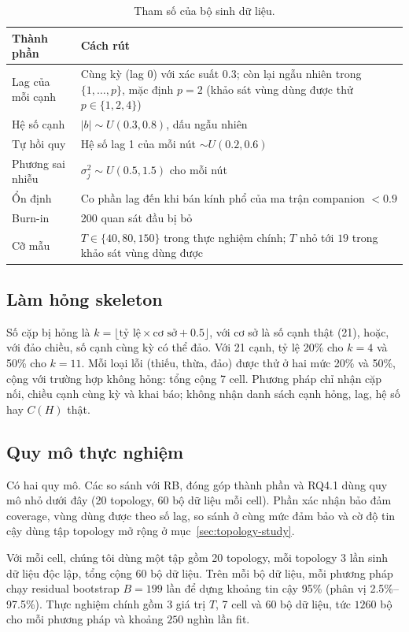 \begin{table}[H]
\centering\small
\begin{tabularx}{\textwidth}{>{\raggedright\arraybackslash}p{4.3cm}Y}
\toprule
Thành phần & Cách rút\\
\midrule
Lag của mỗi cạnh & Cùng kỳ (lag 0) với xác suất $0.3$; còn lại ngẫu nhiên trong $\{1,\dots,p\}$, mặc định $p=2$ (khảo sát vùng dùng được thử $p\in\{1,2,4\}$)\\
Hệ số cạnh & $|b|\sim U(0.3,0.8)$, dấu ngẫu nhiên\\
Tự hồi quy & Hệ số lag 1 của mỗi nút $\sim U(0.2,0.6)$\\
Phương sai nhiễu & $\sigma_j^2\sim U(0.5,1.5)$ cho mỗi nút\\
Ổn định & Co phần lag đến khi bán kính phổ của ma trận companion $<0.9$\\
Burn-in & 200 quan sát đầu bị bỏ\\
Cỡ mẫu & $T\in\{40,80,150\}$ trong thực nghiệm chính; $T$ nhỏ tới $19$ trong khảo sát vùng dùng được\\
\bottomrule
\end{tabularx}
\caption{Tham số của bộ sinh dữ liệu.}
\end{table}

\subsection{Làm hỏng skeleton}\label{sec:damage}
Số cặp bị hỏng là $k=\lfloor \text{tỷ lệ}\times\text{cơ sở}+0.5\rfloor$, với cơ sở là số cạnh thật (21), hoặc, với đảo chiều, số cạnh cùng kỳ có thể đảo. Với 21 cạnh, tỷ lệ 20\% cho $k=4$ và 50\% cho $k=11$. Mỗi loại lỗi (thiếu, thừa, đảo) được thử ở hai mức 20\% và 50\%, cộng với trường hợp không hỏng: tổng cộng 7 cell. Phương pháp chỉ nhận cặp nối, chiều cạnh cùng kỳ và khai báo; không nhận danh sách cạnh hỏng, lag, hệ số hay $C(H)$ thật.

\subsection{Quy mô thực nghiệm}\label{sec:quymo}
Có hai quy mô. Các so sánh với RB, đóng góp thành phần và RQ4.1 dùng quy mô nhỏ dưới đây (20 topology, 60 bộ dữ liệu mỗi cell). Phần xác nhận bảo đảm coverage, vùng dùng được theo số lag, so sánh ở cùng mức đảm bảo và cờ độ tin cậy dùng tập topology mở rộng ở mục~\ref{sec:topology-study}.

Với mỗi cell, chúng tôi dùng một tập gồm 20 topology, mỗi topology 3 lần sinh dữ liệu độc lập, tổng cộng 60 bộ dữ liệu. Trên mỗi bộ dữ liệu, mỗi phương pháp chạy residual bootstrap $B=199$ lần để dựng khoảng tin cậy 95\% (phân vị 2.5\%--97.5\%). Thực nghiệm chính gồm 3 giá trị $T$, 7 cell và 60 bộ dữ liệu, tức $1260$ bộ cho mỗi phương pháp và khoảng $250$ nghìn lần fit.

